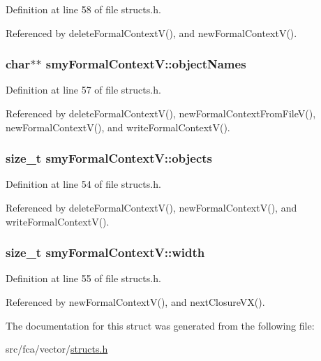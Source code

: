 \-Definition at line 58 of file structs.\-h.



\-Referenced by delete\-Formal\-Context\-V(), and new\-Formal\-Context\-V().

\hypertarget{structsmyFormalContextV_aac85d520aa4849d3dfbe4b1c85c17555}{
\subsubsection[{object\-Names}]{\setlength{\rightskip}{0pt plus 5cm}char$\ast$$\ast$ {\bf smy\-Formal\-Context\-V\-::object\-Names}}}\label{structsmyFormalContextV_aac85d520aa4849d3dfbe4b1c85c17555}


\-Definition at line 57 of file structs.\-h.



\-Referenced by delete\-Formal\-Context\-V(), new\-Formal\-Context\-From\-File\-V(), new\-Formal\-Context\-V(), and write\-Formal\-Context\-V().

\hypertarget{structsmyFormalContextV_a6870c7afe6748004c41c81bd5e1c65d2}{
\subsubsection[{objects}]{\setlength{\rightskip}{0pt plus 5cm}size\-\_\-t {\bf smy\-Formal\-Context\-V\-::objects}}}\label{structsmyFormalContextV_a6870c7afe6748004c41c81bd5e1c65d2}


\-Definition at line 54 of file structs.\-h.



\-Referenced by delete\-Formal\-Context\-V(), new\-Formal\-Context\-V(), and write\-Formal\-Context\-V().

\hypertarget{structsmyFormalContextV_ab4456c63ae1536d8a9afa9a42c30cd10}{
\subsubsection[{width}]{\setlength{\rightskip}{0pt plus 5cm}size\-\_\-t {\bf smy\-Formal\-Context\-V\-::width}}}\label{structsmyFormalContextV_ab4456c63ae1536d8a9afa9a42c30cd10}


\-Definition at line 55 of file structs.\-h.



\-Referenced by new\-Formal\-Context\-V(), and next\-Closure\-V\-X().



\-The documentation for this struct was generated from the following file\-:\begin{DoxyCompactItemize}
\item 
src/fca/vector/\hyperlink{vector_2structs_8h}{structs.\-h}\end{DoxyCompactItemize}
